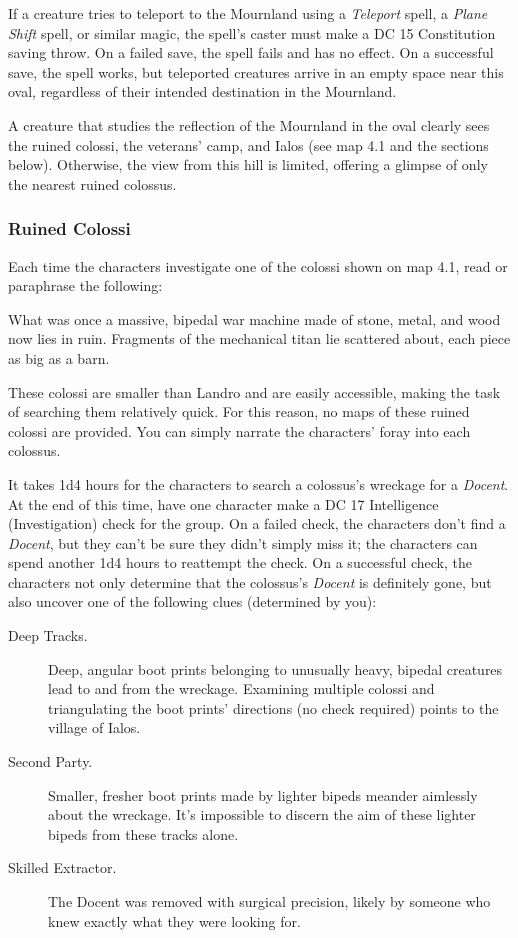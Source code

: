 \documentclass[10pt,a4paper,twoside,bg=print,twocolumn,openany,nodeprecatedcode]{dndbook}
\begin{document}
If a creature tries to teleport to the Mournland using a \textit{Teleport} spell, a \textit{Plane Shift} spell, or similar magic, the spell's caster must make a DC 15 Constitution saving throw. On a failed save, the spell fails and has no effect. On a successful save, the spell works, but teleported creatures arrive in an empty space near this oval, regardless of their intended destination in the Mournland.

A creature that studies the reflection of the Mournland in the oval clearly sees the ruined colossi, the veterans' camp, and Ialos (see map 4.1 and the sections below). Otherwise, the view from this hill is limited, offering a glimpse of only the nearest ruined colossus.

\subsubsection{Ruined Colossi}
Each time the characters investigate one of the colossi shown on map 4.1, read or paraphrase the following:

\begin{DndReadAloud}{}
What was once a massive, bipedal war machine made of stone, metal, and wood now lies in ruin. Fragments of the mechanical titan lie scattered about, each piece as big as a barn.

\end{DndReadAloud}

These colossi are smaller than Landro and are easily accessible, making the task of searching them relatively quick. For this reason, no maps of these ruined colossi are provided. You can simply narrate the characters' foray into each colossus.

It takes 1d4 hours for the characters to search a colossus's wreckage for a \textit{Docent}. At the end of this time, have one character make a DC 17 Intelligence (Investigation) check for the group. On a failed check, the characters don't find a \textit{Docent}, but they can't be sure they didn't simply miss it; the characters can spend another 1d4 hours to reattempt the check. On a successful check, the characters not only determine that the colossus's \textit{Docent} is definitely gone, but also uncover one of the following clues (determined by you):


\begin{description}
\item[Deep Tracks.]
Deep, angular boot prints belonging to unusually heavy, bipedal creatures lead to and from the wreckage. Examining multiple colossi and triangulating the boot prints' directions (no check required) points to the village of Ialos.
\item[Second Party.]
Smaller, fresher boot prints made by lighter bipeds meander aimlessly about the wreckage. It's impossible to discern the aim of these lighter bipeds from these tracks alone.
\item[Skilled Extractor.]
The Docent was removed with surgical precision, likely by someone who knew exactly what they were looking for.
\end{description}
\end{document}

